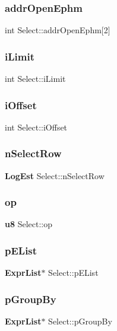 \subsubsection{addrOpenEphm}
{\footnotesize\ttfamily int Select\+::addr\+Open\+Ephm[2]}

\mbox{\label{struct_select_abf68908bf029af42a32c60a2558a8b1e}} 
\subsubsection{iLimit}
{\footnotesize\ttfamily int Select\+::i\+Limit}

\mbox{\label{struct_select_ac12bebd00ed988df3ad1efb8e6c63fe4}} 
\subsubsection{iOffset}
{\footnotesize\ttfamily int Select\+::i\+Offset}

\mbox{\label{struct_select_af9e46e47a41ceb9815690851f7e88219}} 
\subsubsection{nSelectRow}
{\footnotesize\ttfamily \textbf{ Log\+Est} Select\+::n\+Select\+Row}

\mbox{\label{struct_select_a84506d61248313b5e10f7891cb7482be}} 
\subsubsection{op}
{\footnotesize\ttfamily \textbf{ u8} Select\+::op}

\mbox{\label{struct_select_acf92c5d6b0e0e6a3263a77696baaadc8}} 
\subsubsection{pEList}
{\footnotesize\ttfamily \textbf{ Expr\+List}$\ast$ Select\+::p\+E\+List}

\mbox{\label{struct_select_a5b625c7495468ae56ca2f214a76231a0}} 
\subsubsection{pGroupBy}
{\footnotesize\ttfamily \textbf{ Expr\+List}$\ast$ Select\+::p\+Group\+By}

